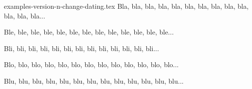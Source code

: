 \begin{filecontents*}[overwrite]{gallery-showcase-draft.tex}
        \subsection*{tdoc#1}

        \myadmotext

        \begin{tdoc#1}
            \myhighlightedtext
        \end{tdoc#1}

        \myadmotext
    }
}

\ExplSyntaxOff

\section{\LaTeX\ codes}

It is essential to be able to demonstrate use cases in \LaTeX.

\begin{tdoclatex}
It's nice to see some formatted \LaTeX\ code : $E = m c^2$ ou $\pi \neq \frac{3}{14}$.
\end{tdoclatex}


There's also a less intrusive side-by-side mode. Nice! No ?

\begin{tdoclatex}[sbs]
It's nice to see some formatted \LaTeX\ code:
$E = m c^2$ or $\pi \neq \frac{3}{14}$.
\end{tdoclatex}



\end{filecontents*}


\begin{filecontents*}[overwrite]{examples-version-n-change-dating.tex}
Bla, bla, bla, bla, bla, bla, bla, bla, bla, bla, bla, bla, bla...

\medskip %


Ble, ble, ble, ble, ble, ble, ble, ble, ble, ble, ble, ble, ble...

\medskip %


Bli, bli, bli, bli, bli, bli, bli, bli, bli, bli, bli, bli, bli...

Blo, blo, blo, blo, blo, blo, blo, blo, blo, blo, blo, blo, blo...

Blu, blu, blu, blu, blu, blu, blu, blu, blu, blu, blu, blu, blu...
\end{filecontents*}


